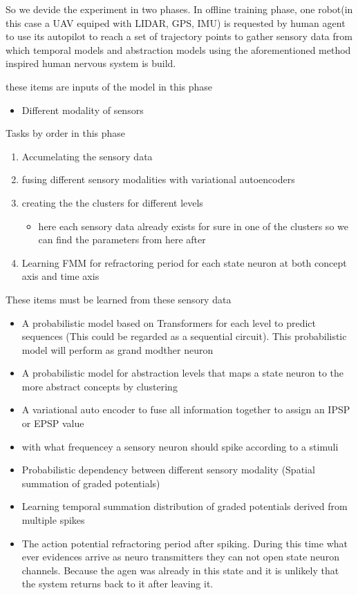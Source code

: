 \documentclass[a4paper]{article}
\begin{document}
        So we devide the experiment in two phases. In offline training phase, one robot(in this case a UAV equiped with LIDAR, GPS, IMU) is requested by human agent to use its autopilot to reach a set of trajectory points to gather sensory data from which temporal models and abstraction models using the aforementioned method inspired human nervous system is build.
        
        these items are inputs of the model in this phase
        \begin{itemize}
            \item Different modality of sensors
        \end{itemize}
        
        Tasks by order in this phase
        \begin{enumerate}
            \item Accumelating the sensory data
            \item fusing different sensory modalities with variational autoencoders
            \item creating the the clusters for different levels
            \begin{itemize}
                \item here each sensory data already exists for sure in one of the clusters so we can find the parameters from here after
            \end{itemize}
            \item Learning FMM for refractoring period for each state neuron at both concept axis and time axis
        \end{enumerate}
        
        These items must be learned from these sensory data
        \begin{itemize}
            \item A probabilistic model based on Transformers for each level to predict sequences (This could be regarded as a sequential circuit). This probabilistic model will perform as grand modther neuron
            \item A probabilistic model for abstraction levels that maps a state neuron to the more abstract concepts by clustering
            \item A variational auto encoder to fuse all information together to assign an IPSP or EPSP value
            \item with what frequencey a sensory neuron should spike according to a stimuli
            \item Probabilistic dependency between different sensory modality (Spatial summation of graded potentials)
            \item Learning temporal summation distribution of graded potentials derived from multiple spikes
            \item The action potential refractoring period after spiking. During this time what ever evidences arrive as neuro transmitters they can not open state neuron channels. Because the agen was already in this state and it is unlikely that the system returns back to it after leaving it.
        \end{itemize}
        
\end{document}
